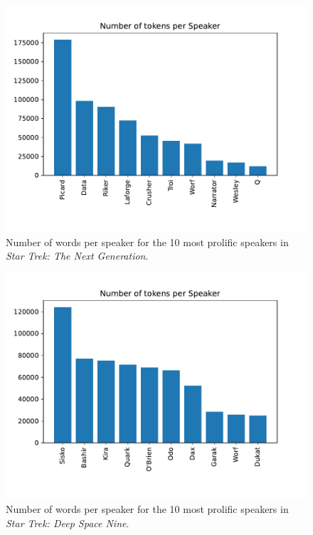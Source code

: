 \begin{figure}
  \centering
  \includegraphics[width=\columnwidth]{figures/localized/tng_speaker_tokens.pdf}
  \caption{Number of words per speaker for the 10 most prolific speakers in \textit{Star Trek: The Next Generation}.}
  \label{fig:tng_speaker_tokens}
\end{figure}

\begin{figure}
  \centering
  \includegraphics[width=\columnwidth]{figures/localized/ds9_speaker_tokens.pdf}
  \caption{Number of words per speaker for the 10 most prolific speakers in \textit{Star Trek: Deep Space Nine}.}
  \label{fig:ds9_speaker_tokens}
\end{figure}

